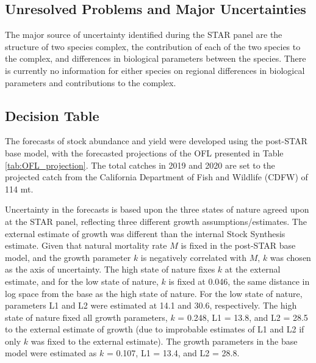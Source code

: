 \documentclass[12pt,]{article}
\begin{document}
\FloatBarrier

\subsection*{Unresolved Problems and Major
Uncertainties}\label{unresolved-problems-and-major-uncertainties}

The major source of uncertainty identified during the STAR panel are the
structure of two species complex, the contribution of each of the two
species to the complex, and differences in biological parameters between
the species. There is currently no information for either species on
regional differences in biological parameters and contributions to the
complex.

\FloatBarrier

\subsection*{Decision Table}\label{decision-table}

The forecasts of stock abundance and yield were developed using the
post-STAR base model, with the forecasted projections of the OFL
presented in Table \ref{tab:OFL_projection}. The total catches in 2019
and 2020 are set to the projected catch from the California Department
of Fish and Wildlife (CDFW) of 114 mt.

Uncertainty in the forecasts is based upon the three states of nature
agreed upon at the STAR panel, reflecting three different growth
assumptions/estimates. The external estimate of growth was different
than the internal Stock Synthesis estimate. Given that natural mortality
rate \(M\) is fixed in the post-STAR base model, and the growth
parameter \(k\) is negatively correlated with \(M\), \(k\) was chosen as
the axis of uncertainty. The high state of nature fixes \(k\) at the
external estimate, and for the low state of nature, \(k\) is fixed at
0.046, the same distance in log space from the base as the high state of
nature. For the low state of nature, parameters L1 and L2 were estimated
at 14.1 and 30.6, respectively. The high state of nature fixed all
growth parameters, \(k\) = 0.248, L1 = 13.8, and L2 = 28.5 to the
external estimate of growth (due to improbable estimates of L1 and L2 if
only \(k\) was fixed to the external estimate). The growth parameters in
the base model were estimated as \(k\) = 0.107, L1 = 13.4, and L2 =
28.8.
\end{document}
